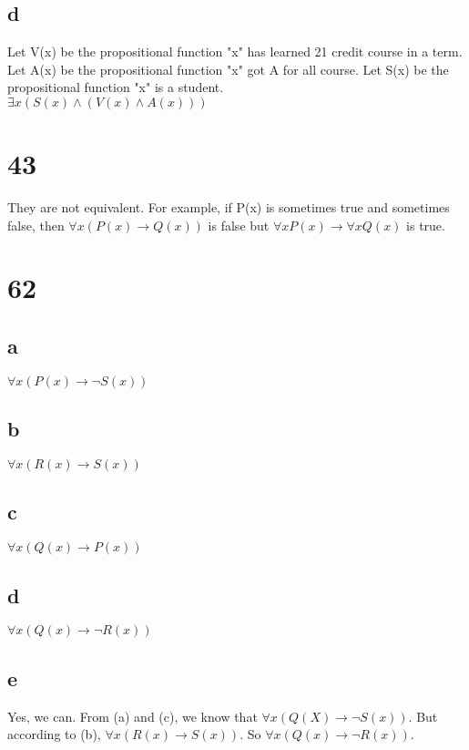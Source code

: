 \documentclass[UTF8]{ctexart}
\begin{document}
    \subsection{d}
    Let V(x) be the propositional function "x" has learned 21 credit course in a term.
    Let A(x) be the propositional function "x" got A for all course.
    Let S(x) be the propositional function "x" is a student.\\
    $\exists x (S(x)\wedge (V(x)\wedge A(x)))$
    \section{43}
    They are not equivalent. For example, if P(x) is sometimes true and sometimes false, then $\forall x (P(x)\rightarrow Q(x))$ is false but $\forall x P(x)\rightarrow \forall x Q(x)$ is true.
    \section{62}
    \subsection{a}
    $\forall x (P(x)\rightarrow \neg S(x))$
    \subsection{b}
    $\forall x (R(x)\rightarrow S(x))$
    \subsection{c}
    $\forall x (Q(x)\rightarrow P(x))$
    \subsection{d}
    $\forall x (Q(x)\rightarrow \neg R(x))$
    \subsection{e}
    Yes, we can. From (a) and (c), we know that $\forall x (Q(X)\rightarrow \neg S(x))$. But according to (b), $\forall x (R(x)\rightarrow S(x))$. So $\forall x (Q(x)\rightarrow \neg R(x))$.
\end{document}
